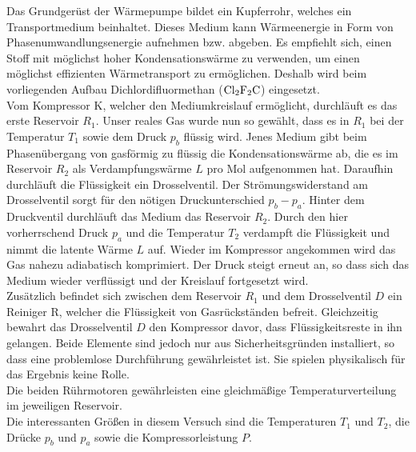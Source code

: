 Das Grundgerüst der Wärmepumpe bildet ein Kupferrohr, welches ein Transportmedium beinhaltet.
Dieses Medium kann Wärmeenergie in Form von Phasenumwandlungsenergie aufnehmen bzw. abgeben.
Es empfiehlt sich, einen Stoff mit möglichst hoher Kondensationswärme zu verwenden, um einen möglichst effizienten Wärmetransport zu ermöglichen.
Deshalb wird beim vorliegenden Aufbau Dichlordifluormethan ($\ce{Cl2F2C}$) eingesetzt.\\
Vom Kompressor K, welcher den Mediumkreislauf ermöglicht, durchläuft es das erste Reservoir $R_1$.
Unser reales Gas wurde nun so gewählt, dass es in $R_1$ bei der Temperatur $T_1$ sowie dem Druck $p_b$ flüssig wird.
Jenes Medium gibt beim Phasenübergang von gasförmig zu flüssig die Kondensationswärme ab, die es im Reservoir $R_2$ als Verdampfungswärme $L$ pro Mol aufgenommen hat.
Daraufhin durchläuft die Flüssigkeit ein Drosselventil.
Der Strömungswiderstand am Drosselventil sorgt für den nötigen Druckunterschied $p_b-p_a$.
Hinter dem Druckventil durchläuft das Medium das Reservoir $R_2$.
Durch den hier vorherrschend Druck $p_a$ und die Temperatur $T_2$ verdampft die Flüssigkeit und nimmt die latente Wärme $L$ auf.
Wieder im Kompressor angekommen wird das Gas nahezu adiabatisch komprimiert.
Der Druck steigt erneut an, so dass sich das Medium wieder verflüssigt und der Kreislauf fortgesetzt wird.\\
Zusätzlich befindet sich zwischen dem Reservoir $R_1$ und dem Drosselventil $D$ ein Reiniger R, welcher die Flüssigkeit von Gasrückständen befreit.
Gleichzeitig bewahrt das Drosselventil $D$ den Kompressor davor, dass Flüssigkeitsreste in ihn gelangen.
Beide Elemente sind jedoch nur aus Sicherheitsgründen installiert, so dass eine problemlose Durchführung gewährleistet ist.
Sie spielen physikalisch für das Ergebnis keine Rolle.\\
Die beiden Rührmotoren gewährleisten eine gleichmäßige Temperaturverteilung im jeweiligen Reservoir.\\
Die interessanten Größen in diesem Versuch sind die Temperaturen $T_1$ und $T_2$, die Drücke $p_b$ und $p_a$ sowie die Kompressorleistung $P$.

